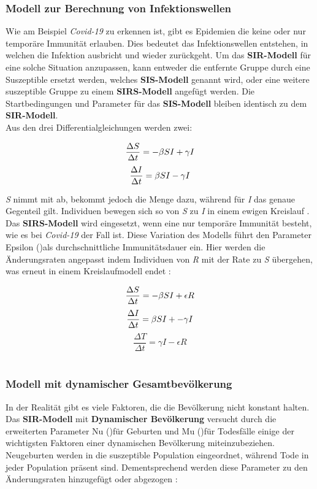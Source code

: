 \documentclass[12pt]{scrartcl} %
\begin{document}

\subsubsection{Modell zur Berechnung von Infektionswellen}

Wie am Beispiel \textsl{Covid-19} zu erkennen ist, gibt es Epidemien die keine oder nur temporäre Immunität erlauben. Dies bedeutet das Infektionswellen entstehen, in welchen die Infektion ausbricht und wieder zurückgeht. Um das \textbf{SIR-Modell} für eine solche Situation anzupassen, kann entweder die entfernte Gruppe durch eine Suszeptible ersetzt werden, welches \textbf{SIS-Modell} genannt wird, oder eine weitere suszeptible Gruppe zu einem \textbf{SIRS-Modell} angefügt werden. Die Startbedingungen und Parameter für das \textbf{SIS-Modell} bleiben identisch zu dem \textbf{SIR-Modell}.\\
Aus den drei Differentialgleichungen werden zwei:

$$ \frac{\Delta S}{\Delta t} = -\beta\space S I + \gamma I $$
$$ \frac{\Delta I}{\Delta t} = \beta\space S I - \gamma I$$

\textit{S} nimmt mit \textbeta\space ab, bekommt jedoch die Menge \textgamma\space dazu, während für \textit{I} das genaue Gegenteil gilt. Individuen bewegen sich so von \textit{S} zu \textit{I} in einem ewigen Kreislauf
\cite{5}.
Das \textbf{SIRS-Modell} wird eingesetzt, wenn eine nur temporäre Immunität besteht, wie es bei \textsl{Covid-19} der Fall ist. Diese Variation des Modells führt den Parameter Epsilon (\textepsilon)\space als durchschnittliche Immunitätsdauer ein. Hier werden die Änderungsraten angepasst indem Individuen von \textit{R} mit der Rate \textepsilon\space zu \textit{S} übergehen, was erneut in einem Kreislaufmodell endet \cite{8}:

$$ \frac{\Delta S}{\Delta t} = -\beta\space S I + \epsilon R $$
$$ \frac{\Delta I}{\Delta t} = \beta\space S I + -\gamma I $$
$$ \frac{\Delta T}{\Delta t} = \gamma I - \epsilon R $$\\

\subsubsection{Modell mit dynamischer Gesamtbevölkerung}

In der Realität gibt es viele Faktoren, die die Bevölkerung nicht konstant halten. Das \textbf{SIR-Modell} mit \textbf{Dynamischer Bevölkerung} versucht durch die erweiterten Parameter Nu (\textnu)\space für Geburten und Mu (\textmu)\space für Todesfälle einige der wichtigsten Faktoren einer dynamischen Bevölkerung miteinzubeziehen. Neugeburten werden in die suszeptible Population eingeordnet, während Tode in jeder Population präsent sind. Dementsprechend werden diese Parameter zu den Änderungsraten hinzugefügt oder abgezogen \cite{8}:
\end{document}
